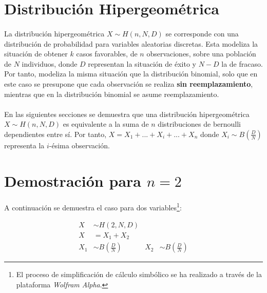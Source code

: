 \documentclass{article}
\begin{document}
	\maketitle
  \thispagestyle{empty}


  \section{Distribución Hipergeométrica}
  \label{sec:description}

    \paragraph{}
    La distribución hipergeométrica $X \sim H(n, N, D)$ se corresponde con una distribución de probabilidad para variables aleatorias discretas. Esta modeliza la situación de obtener $k$ casos favorables, de $n$ observaciones, sobre una población de $N$ individuos, donde $D$ representan la situación de éxito y $N-D$ la de fracaso. Por tanto, modeliza la misma situación que la distribución binomial, solo que en este caso se presupone que cada observación se realiza \textbf{sin reemplazamiento}, mientras que en la distribución binomial se asume reemplazamiento.

    \paragraph{}
    En las siguientes secciones se demuestra que una distribución hipergeométrica $X \sim H(n, N, D)$ es equivalente a la suma de $n$ distribuciones de bernoulli dependientes entre sí. Por tanto, $X = X_1 + ... + X_i + ... + X_n$ donde $X_i \sim B(\frac{D}{N})$ representa la $i$-ésima observación.

  \section{Demostración para $n=2$}
  \label{sec:demostration_1}

    \paragraph{}
    A continuación se demuestra el caso para dos variables\footnote{\label{note1}El proceso de simplificación de cálculo simbólico se ha realizado a través de la plataforma \emph{Wolfram Alpha}.}:

    \begin{align}
      X   &\sim H(2, N, D) \\
      X   &= X_1 + X_2 \\
      X_1 &\sim B(\frac{D}{N}) & X_2 &\sim B(\frac{D}{N})
    \end{align}
\end{document}
